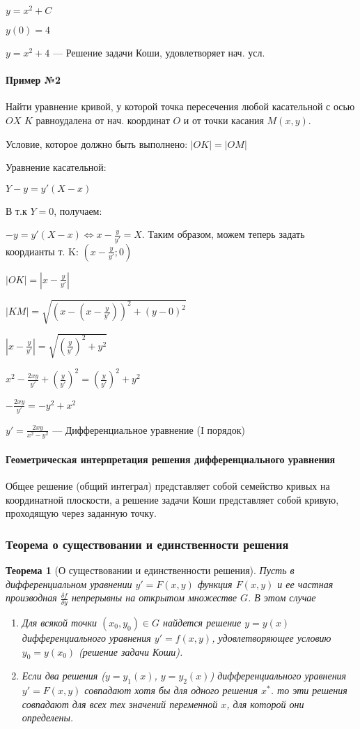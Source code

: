 \documentclass{article}
\newtheorem{theorem}{Теорема}
\begin{document}
$y = x^2 + C$

$y(0) = 4$

$y = x^2 + 4$ — Решение задачи Коши, удовлетворяет нач. усл.

\paragraph{Пример №2}

Найти уравнение кривой, у которой точка пересечения любой касательной с осью $OX$ $K$ равноудалена от нач. координат $O$ и от точки касания $M(x, y)$.

Условие, которое должно быть выполнено: $|OK| = |OM|$

Уравнение касательной:

$Y - y = y' (X - x)$

В т.к $Y = 0$, получаем:

$-y = y'(X - x) \Leftrightarrow x - \frac{y}{y'} = X$. Таким образом, можем теперь задать коордианты т. K: $(x - \frac{y}{y'}; 0)$

$|OK| = |x - \frac{y}{y'}|$

$|KM| = \sqrt{(x - (x - \frac{y}{y'}))^2 + (y - 0)^2}$

$|x - \frac{y}{y'}| = \sqrt{(\frac{y}{y'})^2 + y^2}$

$x^2 - \frac{2xy}{y'} + (\frac{y}{y'})^2 = (\frac{y}{y'})^2 + y^2$

$-\frac{2xy}{y'} = -y^2 + x^2$

$y' = \frac{2xy}{x^2-y^2}$ — Дифференциальное уравнение (I порядок)

\paragraph{Геометрическая интерпретация решения дифференциального уравнения}

Общее решение (общий интеграл) представляет собой семейство кривых на координатной плоскости, а решение задачи Коши представляет собой кривую, проходящую через заданную точку.

\subsubsection{Теорема о существовании и единственности решения}

\begin{theorem}[О существовании и единственности решения]
    Пусть в дифференциальном уравнении $y' = F(x, y)$ функция $F(x, y)$ и ее частная производная $\frac{\delta f}{\delta y}$ непрерывны на открытом множестве $G$. В этом случае
    \begin{enumerate}
        \item Для всякой точки $(x_0, y_0) \in G$ найдется решение $y = y(x)$ дифференциального уравнения $y' = f(x, y)$, удовлетворяющее условию $y_0 = y(x_0)$ (решение задачи Коши).
        \item Если два решения ($y = y_1(x)$, $y = y_2(x)$) дифференциального уравнения $y' = F(x, y)$ совпадают хотя бы для одного решения $x^{*}$. то эти решения совпадают для всех тех значений переменной $x$, для которой они определены.
    \end{enumerate}
\end{theorem}
\end{document}
